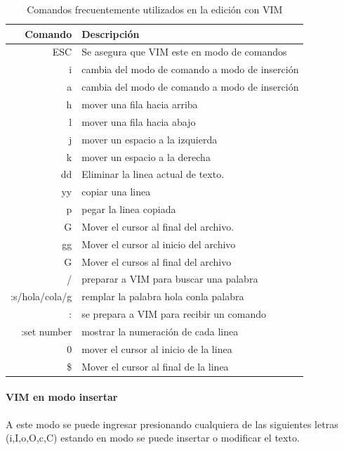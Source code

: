 \documentclass[a4paper,12pt,spanish]{article}
\begin{document}
\begin{table}[H]
  \centering
  \begin{tabular}[H]{rl}
    \hline
    Comando&Descripción \\ \hline
    ESC & Se asegura que VIM este en modo de comandos\\
    i  & cambia del modo de comando a modo de inserción \\
    a  & cambia del modo de comando a modo de inserción \\
    h & mover una fila hacia arriba \\
    l & mover una fila hacia abajo \\
    j & mover un espacio a la izquierda \\
    k & mover un espacio a la derecha \\
    dd &  Eliminar la linea actual de texto.\\
    yy &  copiar una linea \\
    p & pegar la linea copiada\\
         G& Mover el cursor al final del archivo. \\
    gg &  Mover el cursor al inicio del archivo \\
    G & Mover el cursos al final del archivo\\
    / & preparar a VIM para buscar una palabra\\
    :s/hola/cola/g &remplar la palabra hola conla palabra \\
    : & se prepara a VIM para recibir un comando\\
    :set number & mostrar la numeración de cada linea \\
    0 & mover el cursor al inicio de la linea \\
    \$ & Mover el cursor al final de la linea\\ \hline
    
  \end{tabular}
  \caption{Comandos frecuentemente utilizados en la edición con VIM}
  \label{tab:comandovim}
\end{table}

\paragraph{VIM en modo insertar
}


A este modo se puede ingresar presionando cualquiera de las siguientes
letras (i,I,o,O,c,C) estando en modo se puede insertar o modificar el
texto.
\end{document}
